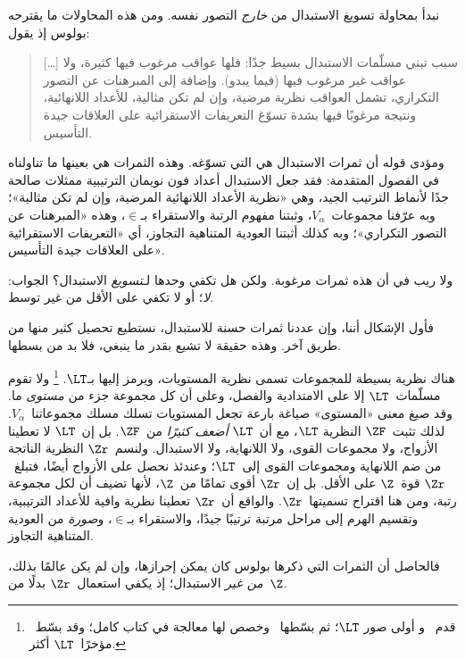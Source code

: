\documentclass[../../../include/open-logic-section]{subfiles}
\begin{document}

نبدأ بمحاولة تسويغ الاستبدال من \emph{خارج} التصور نفسه. ومن هذه
المحاولات ما يقترحه بولوس إذ يقول:
\begin{quote}
  [\ldots] سبب تبني مسلّمات الاستبدال بسيط جدًا: فلها عواقب مرغوب
  فيها كثيرة، ولا عواقب غير مرغوب فيها (فيما يبدو). وإضافة إلى
  المبرهنات عن التصور التكراري، تشمل العواقب نظرية مرضية، وإن لم تكن
  مثالية، للأعداد اللانهائية، ونتيجة مرغوبًا فيها بشدة تسوّغ التعريفات
  الاستقرائية على العلاقات جيدة التأسيس.
  \citep[229]{Boolos1971}
\end{quote}
ومؤدى قوله أن ثمرات الاستبدال هي التي تسوّغه. وهذه الثمرات هي بعينها
ما تناولناه في الفصول المتقدمة: فقد جعل الاستبدال أعداد فون نويمان
الترتيبية ممثلات صالحة جدًا لأنماط الترتيب الجيد، وهي «نظرية الأعداد
اللانهائية المرضية، وإن لم تكن مثالية»؛ وبه عرّفنا مجموعات~$V_\alpha$،
وثبتنا مفهوم الرتبة والاستقراء بـ$\in$، وهذه «المبرهنات عن التصور
التكراري»؛ وبه كذلك أثبتنا العودية المتناهية التجاوز، أي «التعريفات
الاستقرائية على العلاقات جيدة التأسيس».

ولا ريب في أن هذه ثمرات مرغوبة. ولكن هل تكفي وحدها
لـ\emph{تسويغ} الاستبدال؟ الجواب: \emph{لا}؛ أو لا تكفي على
الأقل من غير توسط.

فأول الإشكال أننا، وإن عددنا ثمرات حسنة للاستبدال، نستطيع تحصيل
كثير منها من طريق آخر. وهذه حقيقة لا تشيع بقدر ما ينبغي، فلا بد من
بسطها.

هناك نظرية بسيطة للمجموعات تسمى نظرية المستويات، ويرمز إليها بـ$\LT$.
\footnote{قدم~\citet{Montague1965} و\citet{Scott1974} أولى صور
  $\LT$؛ ثم بسّطها~\citet{Potter2004} وخصص لها معالجة في كتاب كامل؛
  وقد بسّط~\citet{ButtonLT1} مؤخرًا~$\LT$ أكثر.}
ولا تقوم مسلّمات~$\LT$ إلا على الامتدادية والفصل، وعلى أن كل مجموعة
جزء من \emph{مستوى} ما. وقد صيغ معنى «المستوى» صياغة بارعة تجعل
المستويات تسلك مسلك مجموعاتنا~$V_\alpha$. لذلك تثبت~$\ZF$ النظرية
$\LT$، مع أن~$\LT$ \emph{أضعف كثيرًا} من~$\ZF$. بل إن~$\LT$ لا
تعطينا الأزواج، ولا مجموعات القوى، ولا اللانهاية، ولا الاستبدال.
ولنسم~$\Zr$ النظرية الناتجة من ضم اللانهاية ومجموعات القوى إلى~$\LT$؛
وعندئذ نحصل على الأزواج أيضًا، فتبلغ~$\Zr$ قوة~$\Z$ على الأقل. بل
إن~$\Zr$ أقوى تمامًا من~$\Z$، لأنها تضيف أن لكل مجموعة رتبة، ومن هنا
اقتراح تسميتها~$\Zr$. والواقع أن~$\Zr$ تعطينا نظرية وافية للأعداد
الترتيبية، وتقسيم الهرم إلى مراحل مرتبة ترتيبًا جيدًا، والاستقراء
بـ$\in$، و\emph{صورة} من العودية المتناهية التجاوز.

فالحاصل أن الثمرات التي ذكرها بولوس كان يمكن إحرازها، وإن لم يكن
عالمًا بذلك، \emph{من غير} الاستبدال؛ إذ يكفي استعمال~$\Zr$ بدلًا
من~$\Z$.
\end{document}
